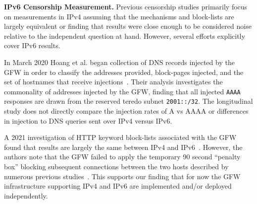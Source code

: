 \textbf{IPv6 Censorship Measurement.}
Previous censorship studies primarily focus on measurements in IPv4
assuming that the mechanisms and block-lists are largely equivalent or finding
that results were close enough to be considered noise relative to the independent
question at hand. However, several efforts explicitly cover IPv6 results.

In March 2020 Hoang et al. began collection of DNS records injected by the GFW in order to
classify the addresses provided, block-pages injected, and the set of hostnames
that receive injections~\cite{USESEC21:GFWatch}. Their analysis investigates the
commonality of addresses injected by the GFW, finding that all injected
\texttt{AAAA} responses are drawn from the reserved teredo subnet \texttt{2001::/32}.
The longitudinal study does not directly compare the injection rates
of A vs AAAA or differences in injection to DNS queries sent over IPv4 versus IPv6.

A 2021 investigation of HTTP keyword block-lists associated with the GFW
found that results are largely the same between IPv4 and IPv6~\cite{weinberg2021chinese}.
However, the authors note that the GFW failed to apply the temporary 90 second ``penalty box''
blocking subsequent connections between the two hosts described by numerous
previous studies~\cite{xu2011internet,clayton2006ignoring}. This supports our finding
that for now the GFW infrastructure supporting IPv4 and IPv6 are implemented
and/or deployed independently.

